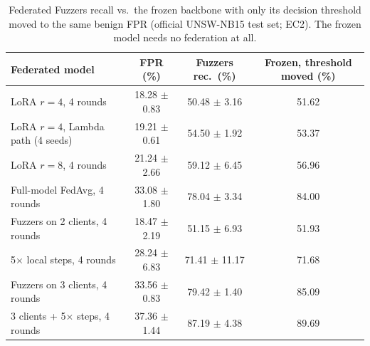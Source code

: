 \begin{table}[t]\centering
\caption{Federated Fuzzers recall vs.\ the frozen backbone with only its decision threshold moved to the same benign FPR (official UNSW-NB15 test set; EC2). The frozen model needs no federation at all.}
\label{tab:threshold}
\begin{tabular}{lccc}\toprule
Federated model & FPR (\%) & Fuzzers rec.\ (\%) & Frozen, threshold moved (\%) \\ \midrule
LoRA $r{=}4$, 4 rounds & 18.28 $\pm$ 0.83 & 50.48 $\pm$ 3.16 & 51.62 \\
LoRA $r{=}4$, Lambda path (4 seeds) & 19.21 $\pm$ 0.61 & 54.50 $\pm$ 1.92 & 53.37 \\
LoRA $r{=}8$, 4 rounds & 21.24 $\pm$ 2.66 & 59.12 $\pm$ 6.45 & 56.96 \\
Full-model FedAvg, 4 rounds & 33.08 $\pm$ 1.80 & 78.04 $\pm$ 3.34 & 84.00 \\
Fuzzers on 2 clients, 4 rounds & 18.47 $\pm$ 2.19 & 51.15 $\pm$ 6.93 & 51.93 \\
5$\times$ local steps, 4 rounds & 28.24 $\pm$ 6.83 & 71.41 $\pm$ 11.17 & 71.68 \\
Fuzzers on 3 clients, 4 rounds & 33.56 $\pm$ 0.83 & 79.42 $\pm$ 1.40 & 85.09 \\
3 clients + 5$\times$ steps, 4 rounds & 37.36 $\pm$ 1.44 & 87.19 $\pm$ 4.38 & 89.69 \\
\bottomrule\end{tabular}\end{table}

